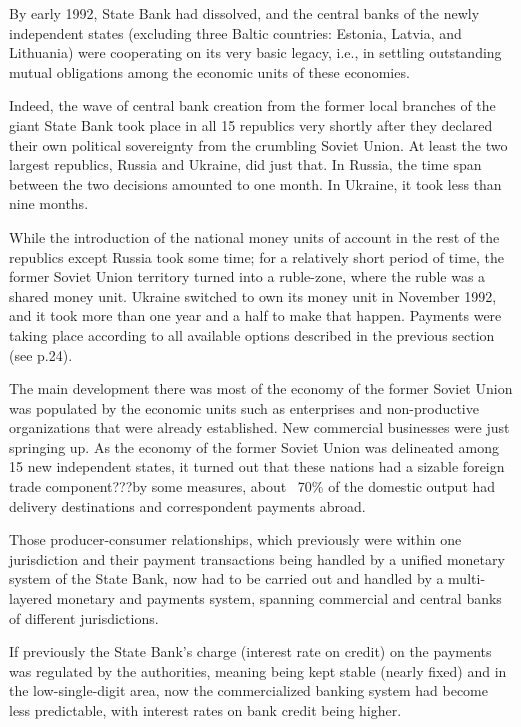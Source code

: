 By early 1992, State Bank had dissolved, and the central banks of the newly independent states (excluding three Baltic countries: Estonia, Latvia, and Lithuania) were cooperating on its very basic legacy, i.e., in settling outstanding mutual obligations among the economic units of these economies.

Indeed, the wave of central bank creation from the former local branches of the giant State Bank took place in all 15 republics very shortly after they declared their own political sovereignty from the crumbling Soviet Union. At least the two largest republics, Russia and Ukraine, did just that. In Russia, the time span between the two decisions amounted to one month. In Ukraine, it took less than nine months.

While the introduction of the national money units of account in the rest of the republics except Russia took some time; for a relatively short period of time, the former Soviet Union territory turned into a ruble-zone, where the ruble was a shared money unit. Ukraine switched to own its money unit in November 1992, and it took more than one year and a half to make that happen. Payments were taking place according to all available options described in the previous section (see p.24).

The main development there was most of the economy of the former Soviet Union was populated by the economic units such as enterprises and non-productive organizations that were already established. New commercial businesses were just springing up. As the economy of the former Soviet Union was delineated among 15 new independent states, it turned out that these nations had a sizable foreign trade component???by some measures, about ~70\% of the domestic output had delivery destinations and correspondent payments abroad. 

Those producer-consumer relationships, which previously were within one jurisdiction and their payment transactions being handled by a unified monetary system of the State Bank, now had to be carried out and handled by a multi-layered monetary and payments system, spanning commercial and central banks of different jurisdictions. 

If previously the State Bank's charge (interest rate on credit) on the payments was regulated by the authorities, meaning being kept stable (nearly fixed) and in the low-single-digit area, now the commercialized banking system had become less predictable, with interest rates on bank credit being higher. 

